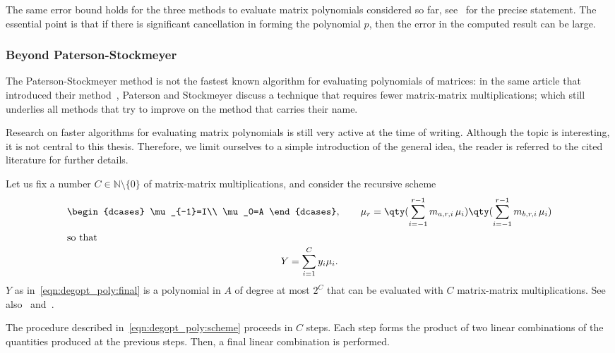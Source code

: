 The same error bound holds for the three methods to evaluate matrix polynomials considered so far, see~\cite[Thm.~4.5]{higham:matfun_book} for the precise statement. The essential point is that if there is significant cancellation in forming the polynomial $p$, then the error in the computed result can be large. 

\subsubsection{Beyond Paterson-Stockmeyer}\label{subs:beyond_p-s}
The Paterson-Stockmeyer method is not the fastest known algorithm for evaluating polynomials of matrices: in the same article that introduced their method~\cite{paterson_stockmeyer:article}, Paterson and Stockmeyer discuss a technique that requires fewer matrix-matrix multiplications; which still underlies all methods that try to improve on the method that carries their name. 

Research on faster algorithms for evaluating matrix polynomials is still very active at the time of writing. Although the topic is interesting, it is not central to this thesis. Therefore, we limit ourselves to a simple introduction of the general idea, the reader is referred to the cited literature for further details.
\smallskip

Let us fix a number $C\in\mathbb{N}\setminus\{0\}$ of matrix-matrix multiplications, and consider the recursive scheme 
\begin{subequations}\label{eqn:degopt_poly:scheme}
\begin{gather}
	\begin{dcases}
		\mu_{-1}=I\\ \mu_0=A
	\end{dcases}, \qquad
	\mu_r= \qty(\sum_{i=-1}^{r-1}m_{a,r,i}\,\mu_i)\qty(\sum_{i=-1}^{r-1}m_{b,r,i}\,\mu_i)\label{eqn:degopt_poly:intermediates}\\
\intertext{so that} 
	Y=\sum_{i=1}^C y_i\mu_i. \label{eqn:degopt_poly:final}
\end{gather}	
\end{subequations}
$Y$ as in~\eqref{eqn:degopt_poly:final} is a polynomial in $A$ of degree at most $2^{C}$ that can be evaluated with $C$ matrix-matrix multiplications. See also~\cite[§~2]{paterson_stockmeyer:article} and~\cite[Eqn.~(2)]{fasi:jfr23_compgraphs}.

\begin{oss*}
	The procedure described in~\eqref{eqn:degopt_poly:scheme} proceeds in $C$ steps. Each step forms the product of two linear combinations of the quantities produced at the previous steps. Then, a final linear combination is performed.
\end{oss*}

